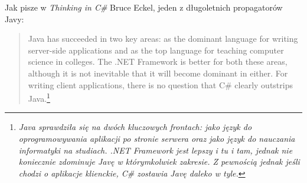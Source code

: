 Jak pisze w {\em Thinking in C\#} Bruce Eckel, jeden z długoletnich propagatorów Javy:

\begin{quote}
Java has succeeded in two key areas: as the dominant language for writing server-side applications
and as the top language for teaching computer science in colleges. The .NET Framework is better
for both these areas, although it is not inevitable that it will become dominant in either.
For writing client applications, there is no question that C\# clearly 
outstrips Java.\footnote{{\em Java sprawdziła się na dwóch kluczowych frontach: jako 
język do oprogramowywania aplikacji po stronie serwera oraz jako język do nauczania informatyki 
na studiach. .NET Framework jest lepszy i tu i tam, jednak nie koniecznie zdominuje Javę w którymkolwiek
zakresie. Z pewnością jednak jeśli chodzi o aplikacje klienckie, C\# zostawia Javę daleko w tyle.}}
\end{quote}
